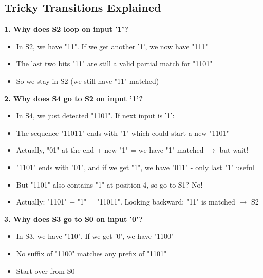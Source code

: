 \documentclass[12pt,a4paper]{article}
\begin{document}
\subsection{Tricky Transitions Explained}

\textbf{1. Why does S2 loop on input '1'?}
\begin{itemize}
    \item In S2, we have "11". If we get another '1', we now have "111"
    \item The last two bits "11" are still a valid partial match for "1101"
    \item So we stay in S2 (we still have "11" matched)
\end{itemize}

\textbf{2. Why does S4 go to S2 on input '1'?}
\begin{itemize}
    \item In S4, we just detected "1101". If next input is '1':
    \item The sequence "1101\textbf{1}" ends with "1" which could start a new "1101"
    \item Actually, "01" at the end + new "1" = we have "1" matched $\rightarrow$ but wait!
    \item "1101" ends with "01", and if we get "1", we have "011" - only last "1" useful
    \item But "1101" also contains "1" at position 4, so go to S1? No!
    \item Actually: "1101" + "1" = "11011". Looking backward: "11" is matched $\rightarrow$ S2
\end{itemize}

\textbf{3. Why does S3 go to S0 on input '0'?}
\begin{itemize}
    \item In S3, we have "110". If we get '0', we have "1100"
    \item No suffix of "1100" matches any prefix of "1101"
    \item Start over from S0
\end{itemize}

\end{document}
